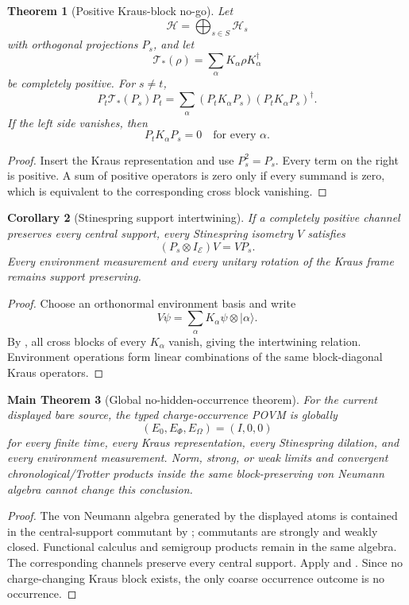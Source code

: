 \documentclass[11pt,oneside,openany]{book}
\numberwithin{equation}{chapter}
\newtheorem{theorem}{Theorem}[chapter]
\newtheorem{corollary}[theorem]{Corollary}
\newtheorem{maintheorem}[theorem]{Main Theorem}
\theoremstyle{definition}
\theoremstyle{remark}
\begin{document}
\begin{theorem}[Positive Kraus-block no-go]
\label{thm:kraus-block-nogo}
Let
\[
 \mathcal H=\bigoplus_{s\in S}\mathcal H_s
\]
with orthogonal projections $P_s$, and let
\[
 \mathcal T_*(\rho)=\sum_\alpha K_\alpha\rho K_\alpha^\dagger
\]
be completely positive.  For $s\ne t$,
\[
 \boxed{
 P_t\mathcal T_*(P_s)P_t
 =\sum_\alpha
 (P_tK_\alpha P_s)(P_tK_\alpha P_s)^\dagger.
 }
\]
If the left side vanishes, then
\[
 \boxed{P_tK_\alpha P_s=0\quad\text{for every }\alpha.}
\]
\end{theorem}

\begin{proof}
Insert the Kraus representation and use $P_s^2=P_s$.  Every term on the right is positive.  A sum of positive operators is zero only if every summand is zero, which is equivalent to the corresponding cross block vanishing.
\end{proof}

\begin{corollary}[Stinespring support intertwining]
\label{cor:stinespring-intertwining}
If a completely positive channel preserves every central support, every Stinespring isometry $V$ satisfies
\[
 \boxed{
 (P_s\otimes I_{\mathcal E})V=VP_s.
 }
\]
Every environment measurement and every unitary rotation of the Kraus frame remains support preserving.
\end{corollary}

\begin{proof}
Choose an orthonormal environment basis and write
\[
 V\psi=\sum_\alpha K_\alpha\psi\otimes|\alpha\rangle.
\]
By , all cross blocks of every $K_\alpha$ vanish, giving the intertwining relation.  Environment operations form linear combinations of the same block-diagonal Kraus operators.
\end{proof}

\begin{maintheorem}[Global no-hidden-occurrence theorem]
\label{thm:global-no-hidden}
For the current displayed bare source, the typed charge-occurrence POVM is globally
\[
 \boxed{(E_0,E_\Phi,E_\Omega)=(I,0,0)}
\]
for every finite time, every Kraus representation, every Stinespring dilation, and every environment measurement.  Norm, strong, or weak limits and convergent chronological/Trotter products inside the same block-preserving von Neumann algebra cannot change this conclusion.
\end{maintheorem}

\begin{proof}
The von Neumann algebra generated by the displayed atoms is contained in the central-support commutant by ; commutants are strongly and weakly closed.  Functional calculus and semigroup products remain in the same algebra.  The corresponding channels preserve every central support.  Apply  and .  Since no charge-changing Kraus block exists, the only coarse occurrence outcome is no occurrence.
\end{proof}
\end{document}
